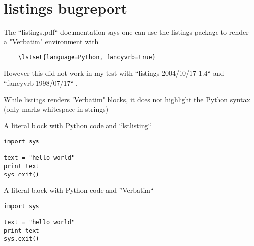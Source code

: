 \documentclass{article}
\begin{document}
\section*{listings bugreport}

The ``listings.pdf`` documentation says one can use the listings package to
render a "Verbatim" environment with

\begin{verbatim}
    \lstset{language=Python, fancyvrb=true}
\end{verbatim}

However this did not work in my test with ``listings 2004/10/17 1.4`` and
``fancyvrb 1998/07/17`` .

While listings renders "Verbatim" blocks, it does not
highlight the Python syntax (only marks whitespace in strings).

A literal block with Python code and ``lstlisting``

\begin{lstlisting}
import sys

text = "hello world"
print text
sys.exit()
\end{lstlisting}

A literal block with Python code and ''Verbatim``

\begin{Verbatim}
import sys

text = "hello world"
print text
sys.exit()
\end{Verbatim}
\end{document}
